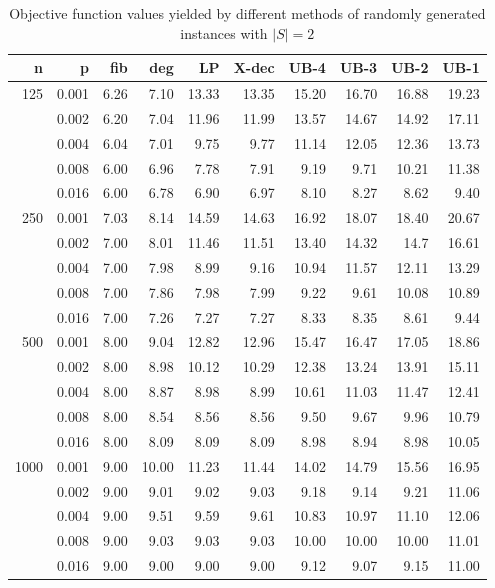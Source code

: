 \begin{table}[]
\centering
\begin{tabular}{rrrrrrrrrr}
n     &	p & fib  & deg  & LP    & X-dec & UB-4  & UB-3  & UB-2  & UB-1  \\
\hline
\multirow{5}{*}{125} 
& 0.001 & 6.26 & 7.10 & 13.33 & 13.35 & 15.20 & 16.70 & 16.88 & 19.23 \\
& 0.002 & 6.20 & 7.04 & 11.96 & 11.99 & 13.57 & 14.67 & 14.92 & 17.11 \\
& 0.004 & 6.04 & 7.01 & 9.75  & 9.77  & 11.14 & 12.05 & 12.36 & 13.73 \\
& 0.008 & 6.00 & 6.96 & 7.78  & 7.91  & 9.19  & 9.71  & 10.21 & 11.38 \\
& 0.016 & 6.00 & 6.78 & 6.90  & 6.97  & 8.10  & 8.27  & 8.62  & 9.40  \\
\hline
\multirow{5}{*}{250} 
& 0.001 & 7.03 & 8.14 & 14.59 & 14.63 & 16.92 & 18.07 & 18.40 & 20.67 \\
& 0.002 & 7.00 & 8.01 & 11.46 & 11.51 & 13.40 & 14.32 & 14.7  & 16.61 \\
& 0.004 & 7.00 & 7.98 & 8.99  & 9.16  & 10.94 & 11.57 & 12.11 & 13.29 \\
& 0.008 & 7.00 & 7.86 & 7.98  & 7.99  & 9.22  & 9.61  & 10.08 & 10.89 \\
& 0.016 & 7.00 & 7.26 & 7.27  & 7.27  & 8.33  & 8.35  & 8.61  & 9.44  \\
\hline
\multirow{5}{*}{500} 
& 0.001 & 8.00 & 9.04 & 12.82 &12.96  &15.47  & 16.47 & 17.05 & 18.86 \\
& 0.002 & 8.00 & 8.98 & 10.12 &10.29  &12.38  & 13.24 & 13.91 & 15.11 \\
& 0.004 & 8.00 & 8.87 & 8.98  &8.99   &10.61  & 11.03 & 11.47 & 12.41 \\
& 0.008 & 8.00 & 8.54 & 8.56  &8.56   &9.50   & 9.67  & 9.96  & 10.79 \\
& 0.016 & 8.00 & 8.09 & 8.09  &8.09   &8.98   & 8.94  & 8.98  & 10.05 \\
\hline
\multirow{5}{*}{1000} 
& 0.001 & 9.00 & 10.00 & 11.23 & 11.44 & 14.02 & 14.79 & 15.56 & 16.95 \\
& 0.002 & 9.00 & 9.01  & 9.02  & 9.03  & 9.18  & 9.14  & 9.21  & 11.06 \\
& 0.004 & 9.00 & 9.51  & 9.59  & 9.61  & 10.83 & 10.97 & 11.10 & 12.06 \\
& 0.008 & 9.00 & 9.03  & 9.03  & 9.03  & 10.00 & 10.00 & 10.00 & 11.01 \\
& 0.016 & 9.00 & 9.00  & 9.00  & 9.00  & 9.12  & 9.07  & 9.15  & 11.00 \\
\end{tabular}
\caption{Objective function values yielded by different methods of randomly generated instances with $|S|=2$}
\label{tab:obj-s2}
\end{table}

